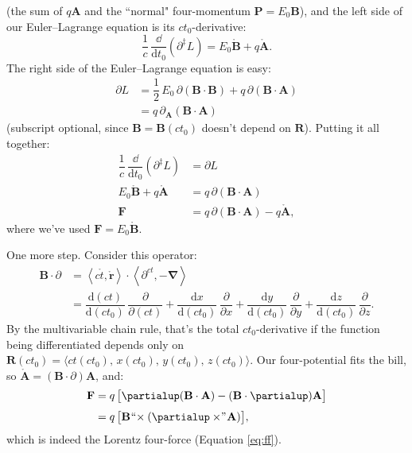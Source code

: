 \documentclass[12pt]{article}
\renewcommand{\vv}[1]{\mathbf{#1}}
\newcommand{\dd}[1]{\mathrm{d}#1}
\newcommand{\del}{\boldsymbol{\nabla}}
\begin{document}
(the sum of $q \vv A$ and the ``normal" four-momentum $\vv P = E_0 \vv B$), and the left side of our Euler--Lagrange equation is its $ct_0$-derivative:
\begin{equation*}
\dfrac{1}{c} \, \dfrac{\dd}{\dd t_0} \left( \partialup^\ddagger L \right) =  E_0 \mathring{\vv B} + q \mathring{\vv A} .
\end{equation*}
The right side of the Euler--Lagrange equation is easy:
\begin{equation*}
\begin{split}
\partialup L &= \dfrac{1}{2} \, E_0 \, \partialup (\vv B \cdot \vv B) + q \, \partialup (\vv B \cdot \vv A) \\[2pt]
&= q \, \partialup_{\vv A} (\vv B \cdot \vv A)
\end{split}
\end{equation*}
(subscript optional, since $\vv B = \vv B(ct_0)$ doesn't depend on $\vv R$). Putting it all together:
\begin{equation*}
\begin{split}
\dfrac{1}{c} \, \dfrac{\dd}{\dd t_0} \left( \partialup^\ddagger L \right) &= \partialup L \\[2pt]
E_0 \mathring{\vv B} + q \mathring{\vv A} &= q \, \partialup (\vv B \cdot \vv A) \\[3pt]
\vv F &= q \, \partialup (\vv B \cdot \vv A) - q \mathring{\vv A} ,
\end{split}
\end{equation*}
where we've used $\vv F = E_0 \mathring{\vv B}$.

One more step. Consider this operator:
\begin{equation*}
\begin{split}
\vv B \cdot \partialup &= \left \langle c \mathring{t}, \mathring{\vv r} \right \rangle \cdot \left \langle \partial^{ct}, - \del \right \rangle \\[3pt]
&= \dfrac{\dd (ct)}{\dd (ct_0)} \, \dfrac{\partial}{\partial (ct)} + \dfrac{\dd x}{\dd (ct_0)} \, \dfrac{\partial}{\partial x} +  \dfrac{\dd y}{\dd (ct_0)} \, \dfrac{\partial}{\partial y} + \dfrac{\dd z}{\dd (ct_0)} \, \dfrac{\partial}{\partial z} .
\end{split}
\end{equation*}
By the multivariable chain rule, that's the total $ct_0$-derivative if the function being differentiated depends only on ${\vv R (ct_0) = \langle ct (ct_0), \, x (ct_0), \, y (ct_0), \, z (ct_0) \rangle}$. Our four-potential fits the bill, so $\mathring{\vv A} = (\vv B \cdot \partialup) \vv A $, and:
\begin{equation*}
\begin{split}
\vv F &= q \, \bigl[ \partialup (\vv B \cdot \vv A) - (\vv B \cdot \partialup) \vv A \bigr] \\[3pt]
&= q \, \bigl[ \vv B \mkern1mu `` \mkern-4mu \times (\partialup \times \mkern-4mu " \mkern1mu \vv A) \bigr] ,
\end{split}
\end{equation*}
which is indeed the Lorentz four-force (Equation \ref{eq:ff}).
\end{document}

